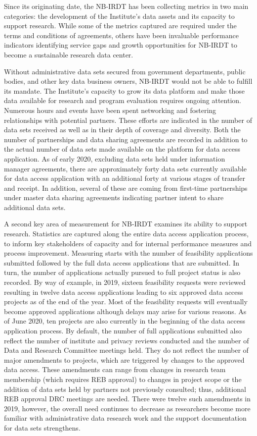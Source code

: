 \documentclass[
]{book}
\begin{document}
Since its originating date, the NB-IRDT has been collecting metrics in two main categories: the development of the Institute's data assets and its capacity to support research. While some of the metrics captured are required under the terms and conditions of agreements, others have been invaluable performance indicators identifying service gaps and growth opportunities for NB-IRDT to become a sustainable research data center.

Without administrative data sets secured from government departments, public bodies, and other key data business owners, NB-IRDT would not be able to fulfill its mandate. The Institute's capacity to grow its data platform and make those data available for research and program evaluation requires ongoing attention. Numerous hours and events have been spent networking and fostering relationships with potential partners. These efforts are indicated in the number of data sets received as well as in their depth of coverage and diversity. Both the number of partnerships and data sharing agreements are recorded in addition to the actual number of data sets made available on the platform for data access application. As of early 2020, excluding data sets held under information manager agreements, there are approximately forty data sets currently available for data access application with an additional forty at various stages of transfer and receipt. In addition, several of these are coming from first-time partnerships under master data sharing agreements indicating partner intent to share additional data sets.

A second key area of measurement for NB-IRDT examines its ability to support research. Statistics are captured along the entire data access application process, to inform key stakeholders of capacity and for internal performance measures and process improvement. Measuring starts with the number of feasibility applications submitted followed by the full data access applications that are submitted. In turn, the number of applications actually pursued to full project status is also recorded. By way of example, in 2019, sixteen feasibility requests were reviewed resulting in twelve data access applications leading to six approved data access projects as of the end of the year. Most of the feasibility requests will eventually become approved applications although delays may arise for various reasons. As of June 2020, ten projects are also currently in the beginning of the data access application process. By default, the number of full applications submitted also reflect the number of institute and privacy reviews conducted and the number of Data and Research Committee meetings held. They do not reflect the number of major amendments to projects, which are triggered by changes to the approved data access. These amendments can range from changes in research team membership (which requires REB approval) to changes in project scope or the addition of data sets held by partners not previously consulted; thus, additional REB approval DRC meetings are needed. There were twelve such amendments in 2019, however, the overall need continues to decrease as researchers become more familiar with administrative data research work and the support documentation for data sets strengthens.
\end{document}
